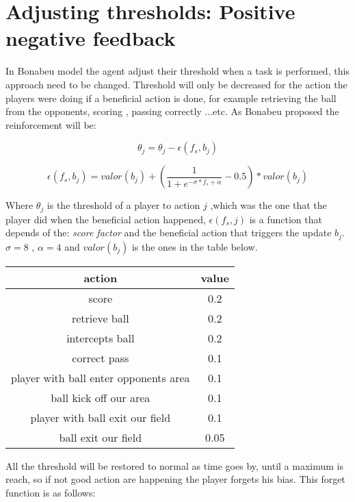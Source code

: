 \documentclass[
10pt, %
a4paper, %
oneside, %
headinclude,footinclude, %
BCOR5mm, %
]{scrartcl}
\begin{document}
\section{Adjusting thresholds: Positive negative feedback}

In Bonabeu model \cite{bonabeau1997adaptive} the agent adjust their threshold when a task is performed, this approach need to be changed. Threshold will only be decreased for the action the players were doing if a beneficial action is done, for example retrieving the ball from the opponents, scoring , passing correctly ...etc. As Bonabeu proposed the  reinforcement will be:

\begin{equation}
	\theta_j = \theta_j - \epsilon(f_s,b_j)
\end{equation} 

\begin{equation}
	\epsilon(f_s,b_j) = valor(b_j) + (\frac{1}{1 + e^{-\sigma * f_s + \alpha}} - 0.5)*valor(b_j)
\end{equation}

Where $\theta_j$ is the threshold of a player to action $j$ ,which was the one that the player did when the beneficial action happened, $\epsilon(f_s,j)$ is a function that depends of the: \textit{score factor} and the beneficial action that triggers the update $b_j$.$\sigma = 8$ , $\alpha = 4$ and $valor(b_j)$ is the ones in the table below.\\

\begin{center}
\begin{tabular}{ |c|c| } 
 \hline
 action & value \\
 \hline\hline
 score & 0.2\\ 
 retrieve ball & 0.2\\
 intercepts ball & 0.2\\
 correct pass & 0.1\\
 player with ball enter opponents area & 0.1\\
 ball kick off our area & 0.1\\
 player with ball exit our field & 0.1 \\
 ball exit our field & 0.05\\   
 \hline
\end{tabular}
\end{center}

All the threshold will be restored to normal as time goes by, until a maximum is reach, so if not good action are happening the player forgets his bias. This forget function is as follows:
\end{document}
